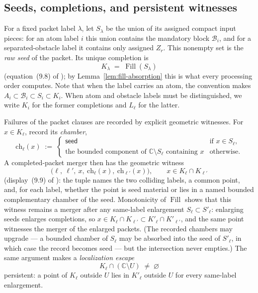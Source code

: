 \documentclass[11pt,reqno]{amsart}
\theoremstyle{definition}
\theoremstyle{remark}
\newcommand{\C}{\mathbb C}
\newcommand{\Fill}{\operatorname{Fill}}
\begin{document}
\subsection{Seeds, completions, and persistent witnesses}\label{subsec:E-witnesses}

For a fixed packet label $\lambda$, let $S_\lambda$ be the union of its
assigned compact input pieces: for an atom label $i$ this union contains
the mandatory block $\mathcal B_i$, and for a separated-obstacle label it contains
only assigned $Z_r$.  This nonempty set is the \emph{raw seed} of the packet. Its unique completion is
\begin{equation}\label{eq:E-completion}
K_\lambda\;=\;\Fill(S_\lambda)
\end{equation}
(equation~(9.8) of \cite{MWman}); by Lemma~\ref{lem:fill-absorption} this is what
every processing order computes. Note that when the label carries an atom, the
convention makes $A_i\subset\mathcal B_i\subset S_i\subset K_i$.  When atom and
obstacle labels must be distinguished, we write $K_i$ for the former
completions and $L_\ell$ for the latter.

Failures of the packet clauses are recorded by explicit geometric witnesses. For
$x\in K_\ell$, record its \emph{chamber},
\[
\mathrm{ch}_\ell(x)\;:=\;
\begin{cases}
\textsf{seed} & \text{if }x\in S_\ell,\\[2pt]
\text{the bounded component of }\C\setminus S_\ell\text{ containing }x
& \text{otherwise.}
\end{cases}
\]
A completed-packet merger then has the geometric witness
\begin{equation}\label{eq:E-witness}
\bigl(\ell,\ \ell',\ x,\ \mathrm{ch}_\ell(x),\ \mathrm{ch}_{\ell'}(x)\bigr),
\qquad x\in K_\ell\cap K_{\ell'}
\end{equation}
(display~(9.9) of \cite{MWman}): the tuple names the two colliding labels, a common
point, and, for each label, whether the point is seed material or lies in a named
bounded complementary chamber of the seed. Monotonicity of $\Fill$ shows that this
witness remains a merger after any same-label enlargement $S_\ell\subset S'_\ell$:
enlarging seeds enlarges completions, so
$x\in K_\ell\cap K_{\ell'}\subset K'_\ell\cap K'_{\ell'}$, and the same point
witnesses the merger of the enlarged packets. (The recorded chambers may upgrade ---
a bounded chamber of $S_\ell$ may be absorbed into the seed of $S'_\ell$, in which
case the record becomes \textsf{seed} --- but the intersection never empties.) The
same argument makes a \emph{localization escape}
\[
K_\ell\cap(\C\setminus U)\;\neq\;\varnothing
\]
persistent: a point of $K_\ell$ outside $U$ lies in $K'_\ell$ outside $U$ for every
same-label enlargement.
\end{document}
